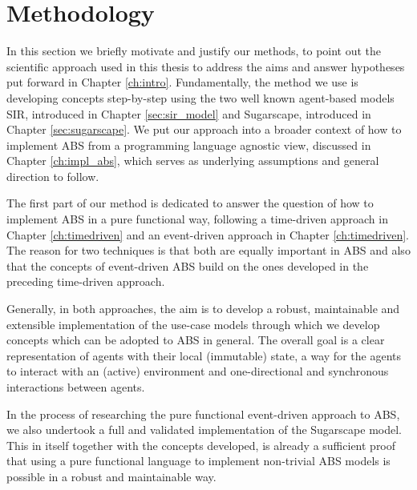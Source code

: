 \chapter{Methodology}
\label{ch:methodology}


In this section we briefly motivate and justify our methods, to point out the scientific approach used in this thesis to address the aims and answer hypotheses put forward in Chapter \ref{ch:intro}. Fundamentally, the method we use is developing concepts step-by-step using the two well known agent-based models SIR, introduced in Chapter \ref{sec:sir_model} and Sugarscape, introduced in Chapter \ref{sec:sugarscape}. We put our approach into a broader context of how to implement ABS from a programming language agnostic view, discussed in Chapter \ref{ch:impl_abs}, which serves as underlying assumptions and general direction to follow.

The first part of our method is dedicated to answer the question of how to implement ABS in a pure functional way, following a time-driven approach in Chapter \ref{ch:timedriven} and an event-driven approach in Chapter \ref{ch:timedriven}. The reason for two techniques is that both are equally important in ABS and also that the concepts of event-driven ABS build on the ones developed in the preceding time-driven approach.

Generally, in both approaches, the aim is to develop a robust, maintainable and extensible implementation of the use-case models through which we develop concepts which can be adopted to ABS in general. The overall goal is a clear representation of agents with their local (immutable) state, a way for the agents to interact with an (active) environment and one-directional and synchronous interactions between agents. 

In the process of researching the pure functional event-driven approach to ABS, we also undertook a full and validated implementation of the Sugarscape model. This in itself together with the concepts developed, is already a sufficient proof that using a pure functional language to implement non-trivial ABS models is possible in a robust and maintainable way.

